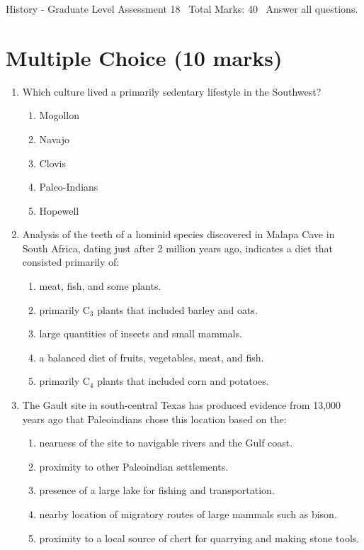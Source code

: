 \documentclass[12pt]{article}
\begin{document}
\begin{center}
History - Graduate Level Assessment 18 \
Total Marks: 40 \
Answer all questions.
\end{center}

\section*{Multiple Choice (10 marks)}
\begin{enumerate}[label=\arabic*.]
\item Which culture lived a primarily sedentary lifestyle in the Southwest?
\begin{enumerate}[label=(\alph*)]
    \item Mogollon
    \item Navajo
    \item Clovis
    \item Paleo-Indians
    \item Hopewell
\end{enumerate}
\item Analysis of the teeth of a hominid species discovered in Malapa Cave in South Africa, dating just after 2 million years ago, indicates a diet that consisted primarily of:
\begin{enumerate}[label=(\alph*)]
    \item meat, fish, and some plants.
    \item primarily C$_{3}$ plants that included barley and oats.
    \item large quantities of insects and small mammals.
    \item a balanced diet of fruits, vegetables, meat, and fish.
    \item primarily C$_{4}$ plants that included corn and potatoes.
\end{enumerate}
\item The Gault site in south-central Texas has produced evidence from 13,000 years ago that Paleoindians chose this location based on the:
\begin{enumerate}[label=(\alph*)]
    \item nearness of the site to navigable rivers and the Gulf coast.
    \item proximity to other Paleoindian settlements.
    \item presence of a large lake for fishing and transportation.
    \item nearby location of migratory routes of large mammals such as bison.
    \item proximity to a local source of chert for quarrying and making stone tools.

\end{enumerate}
\end{enumerate}
\end{document}
